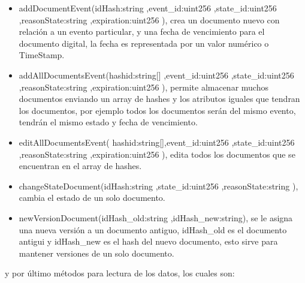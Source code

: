 \begin{itemize}
      \item addDocumentEvent(idHash:string ,event\_id:uint256 ,state\_id:uint256 ,reasonState:string ,expiration:uint256 ), crea un documento nuevo con relación a un evento particular, y una fecha de vencimiento para el documento digital, la fecha
      es representada por un valor numérico o \gls{TimeStamp}.
      \item addAllDocumentsEvent(hashid:string[] ,event\_id:uint256 ,state\_id:uint256 ,reasonState:string ,expiration:uint256 ), permite almacenar muchos documentos enviando un array de hashes y 
      los atributos iguales que tendran los documentos, por ejemplo todos los documentos serán del mismo evento, tendrán el mismo estado  y fecha de vencimiento.
      \item editAllDocumentsEvent( hashid:string[],event\_id:uint256 ,state\_id:uint256 ,reasonState:string ,expiration:uint256 ), edita todos los documentos que se encuentran en el array de hashes.
      \item changeStateDocument(idHash:string ,state\_id:uint256 ,reasonState:string ), cambia el estado de un solo documento.
      \item newVersionDocument(idHash\_old:string ,idHash\_new:string), se le asigna una nueva versión a un documento antiguo, idHash\_old es el documento antigui y idHash\_new es el hash del nuevo documento,
      esto sirve para mantener versiones de un solo documento. 
    \end{itemize}

    y por último métodos para lectura de los datos, los cuales son:

